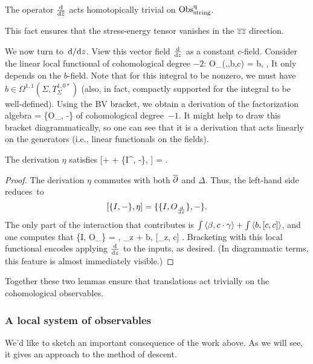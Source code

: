 \begin{lem}
The operator $\frac{{\rm d}}{{\rm d} \overline{z}}$ acts homotopically trivial on ${\rm Obs}^{\rm q}_{\rm string}$. 
\end{lem}

This fact ensures that the stress-energy tensor vanishes in the $\overline{z}\overline{z}$ direction.

We now turn to~${\rm d}/{\rm d} z$.
View this vector field $\frac{{\rm d}}{{\rm d} z}$ as a constant $c$-field. 
Consider the linear local functional of cohomological degree $-2$:
\ben
O_{}(\beta,\gamma,b,c) = \int \<b, \>,
\een
It only depends on the $b$-field.
Note that for this integral to be nonzero, 
we must have $b \in \Omega^{1,1}(\Sigma , T_\Sigma^{1,0*})$
(also, in fact, compactly supported for the integral to be well-defined). 
Using the BV bracket, we obtain a derivation of the factorization algebra 
\ben
\eta = \{O_{}, -\}
\een
of cohomological degree~$-1$. 
It might help to draw this bracket diagrammatically, 
so one can see that it is a derivation that acts linearly on the generators
(i.e., linear functionals on the fields).


\begin{lem} 
The derivation $\eta$ satisfies 
\be\label{d/dz}
[\dbar + \hbar \Delta + \{I^\q, -\}, \eta] = .
\ee
\end{lem}
\begin{proof}
The derivation $\eta$ commutes with both $\overline{\partial}$ and $\Delta$. 
Thus, the left-hand side reduces~to
\[
[\{I, -\}, \eta] = \{ \{I, O_{\frac{{\rm d}}{{\rm d} z}}\}, -\}.
\]
The only part of the interaction that contributes is $\int \left\langle\beta, c \cdot \gamma\right\rangle + \int \left\langle b, [c,c]\right\rangle$, and one computes that
\ben
\{I, O_{}\} = \int \<\beta, \partial_z \gamma\> + \int\<b, [\partial_z, c]\> .
\een
Bracketing with this local functional encodes applying $\frac{{\rm d}}{{\rm d} z}$ to the inputs, as desired.
(In diagrammatic terms, this feature is almost immediately visible.)
\end{proof}

Together these two lemmas ensure that translations act trivially on the cohomological observables.

\subsubsection{A local system of observables}

We'd like to sketch an important consequence of the work above.
As we will see, it gives an approach to the method of descent.

